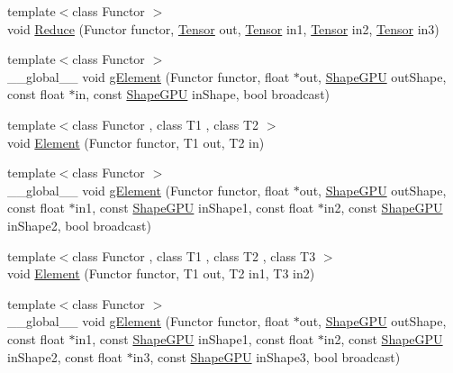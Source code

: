 \begin{DoxyCompactItemize}
\item 
{\footnotesize template$<$class Functor $>$ }\\void \hyperlink{namespacemarian_ab0049b69592fcc4f7e92641c4d960315}{Reduce} (Functor functor, \hyperlink{namespacemarian_a88b71ec34bb354564cddc24eb80f7e14}{Tensor} out, \hyperlink{namespacemarian_a88b71ec34bb354564cddc24eb80f7e14}{Tensor} in1, \hyperlink{namespacemarian_a88b71ec34bb354564cddc24eb80f7e14}{Tensor} in2, \hyperlink{namespacemarian_a88b71ec34bb354564cddc24eb80f7e14}{Tensor} in3)
\item 
{\footnotesize template$<$class Functor $>$ }\\\+\_\+\+\_\+global\+\_\+\+\_\+ void \hyperlink{namespacemarian_aea1055f9f625245cb25935ac339ec283}{g\+Element} (Functor functor, float $\ast$out, \hyperlink{structmarian_1_1ShapeGPU}{Shape\+G\+PU} out\+Shape, const float $\ast$in, const \hyperlink{structmarian_1_1ShapeGPU}{Shape\+G\+PU} in\+Shape, bool broadcast)
\item 
{\footnotesize template$<$class Functor , class T1 , class T2 $>$ }\\void \hyperlink{namespacemarian_af90a9ca647f95f9d9d18ac8901c55fb1}{Element} (Functor functor, T1 out, T2 in)
\item 
{\footnotesize template$<$class Functor $>$ }\\\+\_\+\+\_\+global\+\_\+\+\_\+ void \hyperlink{namespacemarian_ac56e4fc572e5267a3af0d36864ce665f}{g\+Element} (Functor functor, float $\ast$out, \hyperlink{structmarian_1_1ShapeGPU}{Shape\+G\+PU} out\+Shape, const float $\ast$in1, const \hyperlink{structmarian_1_1ShapeGPU}{Shape\+G\+PU} in\+Shape1, const float $\ast$in2, const \hyperlink{structmarian_1_1ShapeGPU}{Shape\+G\+PU} in\+Shape2, bool broadcast)
\item 
{\footnotesize template$<$class Functor , class T1 , class T2 , class T3 $>$ }\\void \hyperlink{namespacemarian_ad6fbbc10b0be7e4b842ed71399cca997}{Element} (Functor functor, T1 out, T2 in1, T3 in2)
\item 
{\footnotesize template$<$class Functor $>$ }\\\+\_\+\+\_\+global\+\_\+\+\_\+ void \hyperlink{namespacemarian_a6ef6e7153edbf1059f24fc8c3f399996}{g\+Element} (Functor functor, float $\ast$out, \hyperlink{structmarian_1_1ShapeGPU}{Shape\+G\+PU} out\+Shape, const float $\ast$in1, const \hyperlink{structmarian_1_1ShapeGPU}{Shape\+G\+PU} in\+Shape1, const float $\ast$in2, const \hyperlink{structmarian_1_1ShapeGPU}{Shape\+G\+PU} in\+Shape2, const float $\ast$in3, const \hyperlink{structmarian_1_1ShapeGPU}{Shape\+G\+PU} in\+Shape3, bool broadcast)

\end{DoxyCompactItemize}
